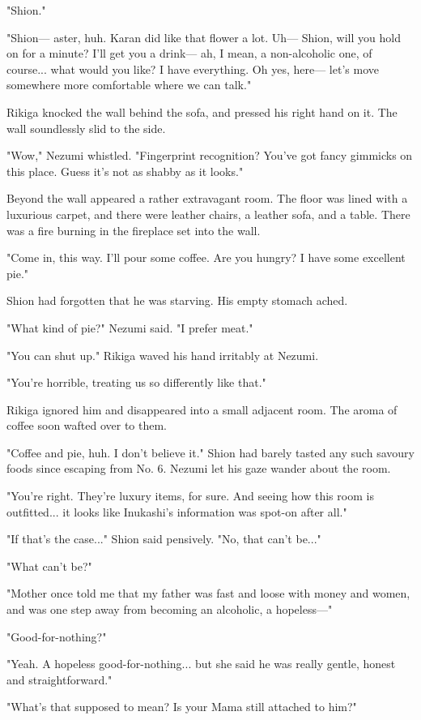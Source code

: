 "Shion."

"Shion--- aster, huh. Karan did like that flower a lot. Uh--- Shion, will
you hold on for a minute? I'll get you a drink--- ah, I mean, a
non-alcoholic one, of course... what would you like? I have everything.
Oh yes, here--- let's move somewhere more comfortable where we can talk."

Rikiga knocked the wall behind the sofa, and pressed his right hand on
it. The wall soundlessly slid to the side.

"Wow," Nezumi whistled. "Fingerprint recognition? You've got fancy
gimmicks on this place. Guess it's not as shabby as it looks."

Beyond the wall appeared a rather extravagant room. The floor was lined
with a luxurious carpet, and there were leather chairs, a leather sofa,
and a table. There was a fire burning in the fireplace set into the
wall.

"Come in, this way. I'll pour some coffee. Are you hungry? I have some
excellent pie."

Shion had forgotten that he was starving. His empty stomach ached.

"What kind of pie?" Nezumi said. "I prefer meat."

"You can shut up." Rikiga waved his hand irritably at Nezumi.

"You're horrible, treating us so differently like that."

Rikiga ignored him and disappeared into a small adjacent room. The aroma
of coffee soon wafted over to them.

"Coffee and pie, huh. I don't believe it." Shion had barely tasted any
such savoury foods since escaping from No. 6. Nezumi let his gaze wander
about the room.

"You're right. They're luxury items, for sure. And seeing how this room
is outfitted... it looks like Inukashi's information was spot-on after
all."

"If that's the case..." Shion said pensively. "No, that can't be..."

"What can't be?"

"Mother once told me that my father was fast and loose with money and
women, and was one step away from becoming an alcoholic, a hopeless---"

"Good-for-nothing?"

"Yeah. A hopeless good-for-nothing... but she said he was really gentle,
honest and straightforward."

"What's that supposed to mean? Is your Mama still attached to him?"

